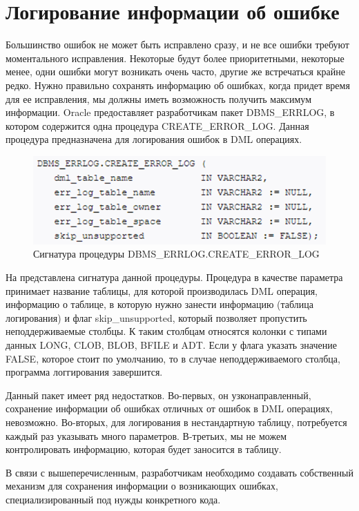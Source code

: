 \section{Логирование информации об ошибке}\label{ch1:sec6}
Большинство ошибок не может быть исправлено сразу, и не все ошибки требуют моментального исправления. Некоторые будут более приоритетными, некоторые менее, одни ошибки могут возникать очень часто, другие же встречаться крайне редко. Нужно правильно сохранять информацию об ошибках, когда придет время для ее исправления, мы должны иметь возможность получить максимум информации. Oracle предоставляет разработчикам пакет DBMS\_ERRLOG, в котором содержится одна процедура CREATE\_ERROR\_LOG. Данная процедура предназначена для логирования ошибок в DML операциях. 


\begin{figure}[ht!] 
	\center
	\includegraphics [scale=1] {my_folder/img/C1_create_error_log_syntax}
	\caption{Сигнатура процедуры DBMS\_ERRLOG.CREATE\_ERROR\_LOG} 
	\label{fig:C1_create_error_log_syntax}  
\end{figure}
\FloatBarrier

На  представлена сигнатура данной процедуры. Процедура в качестве параметра принимает название таблицы, для которой производилась DML операция, информацию о таблице, в которую нужно занести информацию (таблица логирования) и флаг skip\_unsupported, который позволяет пропустить неподдерживаемые столбцы. К таким столбцам относятся колонки с типами данных LONG, CLOB, BLOB, BFILE и ADT. Если у флага указать значение FALSE, которое стоит по умолчанию, то в случае неподдерживаемого столбца, программа логгирования завершится. 

Данный пакет имеет ряд недостатков. Во-первых, он узконаправленный, сохранение информации об ошибках отличных от ошибок в DML операциях, невозможно. Во-вторых, для логирования в нестандартную таблицу, потребуется каждый раз указывать много параметров. В-третьих, мы не можем контролировать информацию, которая будет заносится в таблицу. 

В связи с вышеперечисленным, разработчикам необходимо создавать собственный механизм для сохранения информации о возникающих ошибках, специализированный под нужды конкретного кода. 



